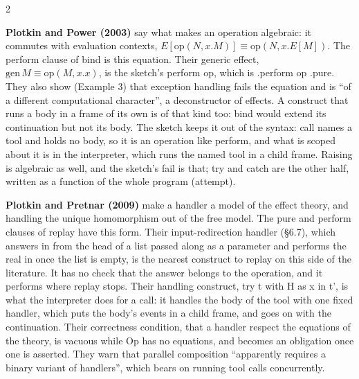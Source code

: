 \documentclass{article}
\newcommand{\topic}[1]{\par\medskip{\bfseries\normalsize #1}\par\smallskip}
\newcommand{\paper}[1]{\par\smallskip\textbf{#1}\quad}
\newcommand{\cd}[1]{{\ttfamily #1}}
\begin{document}
\begin{multicols}{2}
\topic{Handlers}

\paper{Plotkin and Power (2003)} say what makes an operation algebraic: it commutes with
evaluation contexts, $E[\mathrm{op}(N, x.M)] \equiv \mathrm{op}(N, x.E[M])$. The \cd{perform}
clause of \cd{bind} is this equation. Their generic effect, $\mathrm{gen}\,M \equiv
\mathrm{op}(M, x.x)$, is the sketch's \cd{perform op}, which is \cd{.perform op .pure}. They
also show (Example 3) that exception handling fails the equation and is ``of a different
computational character'', a deconstructor of effects. A construct that runs a body in a
frame of its own is of that kind too: \cd{bind} would extend its continuation but not its body.
The sketch keeps it out of the syntax: \cd{call} names a tool and holds no body, so it is an
operation like \cd{perform}, and what is scoped about it is in the interpreter, which runs the
named tool in a child frame. Raising is algebraic as well, and the
sketch's \cd{fail} is that; \cd{try} and \cd{catch} are the other half, written as a function of
the whole program (\cd{attempt}).

\paper{Plotkin and Pretnar (2009)} make a handler a model of the effect theory, and handling the
unique homomorphism out of the free model. The \cd{pure} and
\cd{perform} clauses of \cd{replay} have this form. Their input-redirection handler (\S6.7), which
answers \cd{in} from the head of a list passed along as a parameter and performs the real \cd{in}
once the list is empty, is the nearest construct to \cd{replay} on this side of the literature. It
has no check that the answer belongs to the operation, and it performs where \cd{replay} stops.
Their handling construct, \cd{try t with H as x in t'}, is what the interpreter does for a
\cd{call}: it handles the body of the tool with one fixed handler, which puts the body's events
in a child frame, and goes on with the continuation.
Their correctness condition, that a
handler respect the equations of the theory, is vacuous while \cd{Op} has no equations, and
becomes an obligation once one is asserted. They
warn that parallel composition ``apparently requires a binary variant of handlers'', which bears
on running tool calls concurrently.

\topic{Scopes}


\end{multicols}
\end{document}
